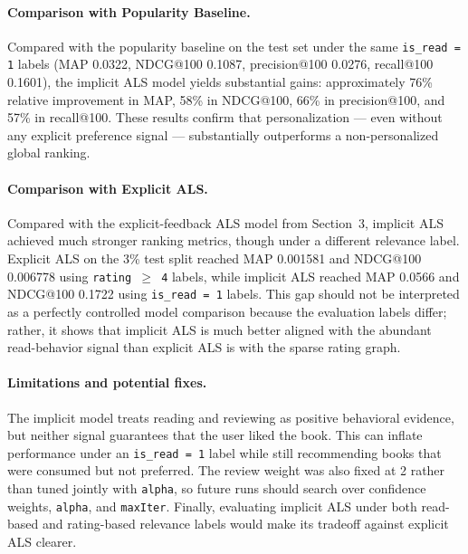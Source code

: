 \documentclass[10pt,twocolumn]{article}
\begin{document}
\paragraph{Comparison with Popularity Baseline.} Compared with the popularity baseline on the test set under the same \texttt{is\_read = 1} labels (MAP 0.0322, NDCG@100 0.1087, precision@100 0.0276, recall@100 0.1601), the implicit ALS model yields substantial gains: approximately 76\% relative improvement in MAP, 58\% in NDCG@100, 66\% in precision@100, and 57\% in recall@100. These results confirm that personalization --- even without any explicit preference signal --- substantially outperforms a non-personalized global ranking.

\paragraph{Comparison with Explicit ALS.} Compared with the explicit-feedback ALS model from Section~3, implicit ALS achieved much stronger ranking metrics, though under a different relevance label. Explicit ALS on the 3\% test split reached MAP 0.001581 and NDCG@100 0.006778 using \texttt{rating $\geq$ 4} labels, while implicit ALS reached MAP 0.0566 and NDCG@100 0.1722 using \texttt{is\_read = 1} labels. This gap should not be interpreted as a perfectly controlled model comparison because the evaluation labels differ; rather, it shows that implicit ALS is much better aligned with the abundant read-behavior signal than explicit ALS is with the sparse rating graph.

\paragraph{Limitations and potential fixes.} The implicit model treats reading and reviewing as positive behavioral evidence, but neither signal guarantees that the user liked the book. This can inflate performance under an \texttt{is\_read = 1} label while still recommending books that were consumed but not preferred. The review weight was also fixed at 2 rather than tuned jointly with \texttt{alpha}, so future runs should search over confidence weights, \texttt{alpha}, and \texttt{maxIter}. Finally, evaluating implicit ALS under both read-based and rating-based relevance labels would make its tradeoff against explicit ALS clearer.

\end{document}
